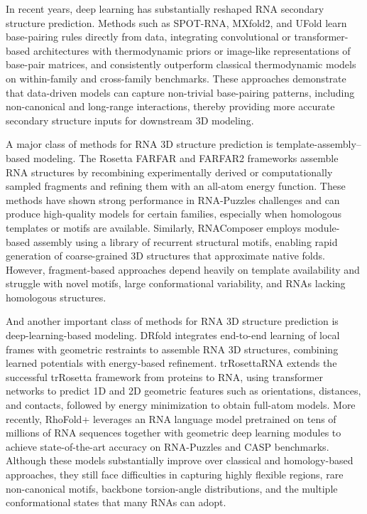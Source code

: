 In recent years, deep learning has substantially reshaped RNA secondary structure prediction. Methods such as SPOT-RNA, MXfold2, and UFold learn base-pairing rules directly from data, integrating convolutional or transformer-based architectures with thermodynamic priors or image-like representations of base-pair matrices, and consistently outperform classical thermodynamic models on within-family and cross-family benchmarks\cite{Singh2019SPOTRNA, Sato2021MXfold2, Fu2022UFold}. These approaches demonstrate that data-driven models can capture non-trivial base-pairing patterns, including non-canonical and long-range interactions, thereby providing more accurate secondary structure inputs for downstream 3D modeling.

A major class of methods for RNA 3D structure prediction is template-assembly–based modeling. The Rosetta FARFAR and FARFAR2 frameworks assemble RNA structures by recombining experimentally derived or computationally sampled fragments and refining them with an all-atom energy function\cite{Watkins2020FARFAR2}. These methods have shown strong performance in RNA-Puzzles challenges and can produce high-quality models for certain families, especially when homologous templates or motifs are available. Similarly, RNAComposer employs module-based assembly using a library of recurrent structural motifs, enabling rapid generation of coarse-grained 3D structures that approximate native folds\cite{Biesiada2016RNAComposerProtocol}. However, fragment-based approaches depend heavily on template availability and struggle with novel motifs, large conformational variability, and RNAs lacking homologous structures.

And another important class of methods for RNA 3D structure prediction is deep-learning-based modeling. DRfold integrates end-to-end learning of local frames with geometric restraints to assemble RNA 3D structures, combining learned potentials with energy-based refinement\cite{Li2023DRfold}. trRosettaRNA extends the successful trRosetta framework from proteins to RNA, using transformer networks to predict 1D and 2D geometric features such as orientations, distances, and contacts, followed by energy minimization to obtain full-atom models\cite{Wang2023trRosettaRNA}. More recently, RhoFold+ leverages an RNA language model pretrained on tens of millions of RNA sequences together with geometric deep learning modules to achieve state-of-the-art accuracy on RNA-Puzzles and CASP benchmarks\cite{Shen2024RhoFoldPlus}. Although these models substantially improve over classical and homology-based approaches, they still face difficulties in capturing highly flexible regions, rare non-canonical motifs, backbone torsion-angle distributions, and the multiple conformational states that many RNAs can adopt.

